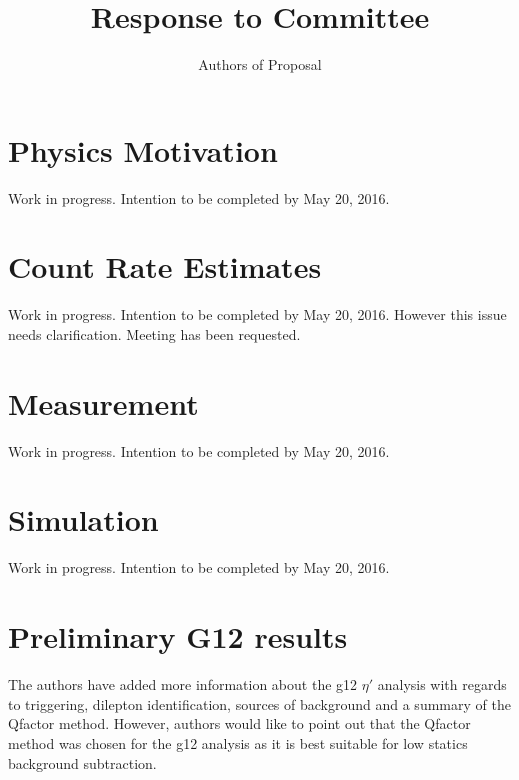 \documentclass[10pt,a4paper]{report}
\author{Authors of Proposal}
\title{Response to Committee }
\begin{document}
\maketitle
\section*{Physics Motivation}	
Work in progress. Intention to be completed by May 20, 2016.
\section*{Count Rate Estimates}	
Work in progress. Intention to be completed by May 20, 2016. However this issue needs clarification. Meeting has been requested. 
\section*{Measurement}	
Work in progress. Intention to be completed by May 20, 2016.
\section*{Simulation}	
Work in progress. Intention to be completed by May 20, 2016.
\section*{Preliminary G12 results}	
The authors have added more information about the g12 $\eta'$ analysis with regards to triggering, dilepton identification, sources of background and a summary of the Qfactor method. However, authors would like to point out that the Qfactor method was chosen for the g12 analysis as it is best suitable for low statics background subtraction.
\end{document}
